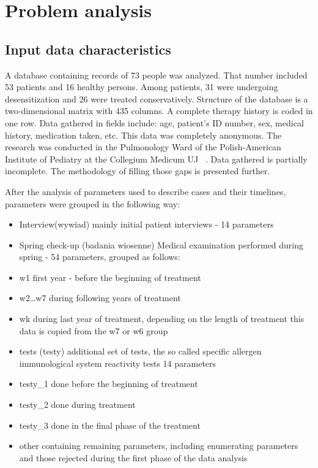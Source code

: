 \documentclass[10pt,oneside]{memoir}
\begin{document}
\part{Problem analysis}
\label{chapter5}

\chapter{Input data characteristics}
\label{inputdatacharacteristics}

A database containing records of 73 people was analyzed. That number included 53 patients and 16 healthy persons. Among patients, 31 were undergoing desensitization and 26 were treated conservatively.
Structure of the database is a two-dimensional matrix with 435 columns. A complete therapy history is coded in one row. Data gathered in fields include: age, patient's ID number, sex, medical history, medication taken, etc. This data was completely anonymous. The research was conducted in the Pulmonology Ward of the Polish-American Institute of Pediatry at the Collegium Medicum UJ ~\cite{Cichocka-Jarosz:1997}.
Data gathered is partially incomplete. The methodology of filling those gaps is presented further.


After the analysis of parameters used to describe cases and their timelines, parameters were grouped in the following way:


\begin{itemize}


\item Interview(wywiad)
mainly initial patient interviews - 14 parameters

\item Spring check-up (badania wiosenne)
Medical examination performed during spring - 54 parameters, grouped as follows:

\item w1
first year - before the beginning of treatment

\item w2{\ldots}w7
during following years of treatment

\item wk
during last year of treatment, depending on the length of treatment this data is copied from the w7 or w6 group




\item tests (testy)
additional set of tests, the so called specific allergen immunological system reactivity tests
14 parameters




\item testy\_1
done before the beginning of treatment

\item testy\_2
done during treatment

\item testy\_3
done in the final phase of the treatment

\item other
containing remaining parameters, including enumerating parameters and those rejected during the first phase of the data analysis
\end{itemize}
\end{document}
